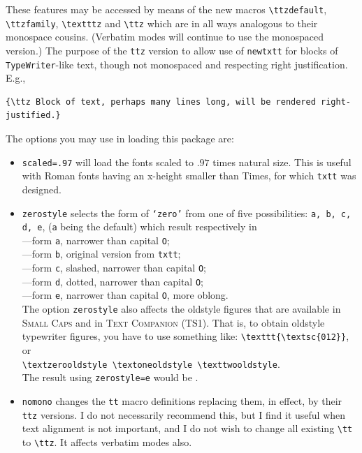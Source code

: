 \documentclass[11pt]{article}
\begin{document}
These features may be accessed by means of the new macros \verb|\ttzdefault|, \verb|\ttzfamily|, \verb|\textttz| and  \verb|\ttz| which are in all ways analogous to their monospace cousins. (Verbatim modes will continue to use the monospaced version.) The purpose of the {\tt ttz} version to allow use of \texttt{newtxtt} for blocks of {\tt TypeWriter}-like text, though not monospaced and respecting  right justification. E.g.,
\begin{verbatim}
{\ttz Block of text, perhaps many lines long, will be rendered right-justified.}
\end{verbatim}

The options you may use in loading this package are:
\begin{itemize}
\item {\tt scaled=.97} will load the fonts scaled to $.97$ times natural size. This is useful with Roman fonts having an x-height smaller than Times, for which {\tt txtt} was designed.
\item
{\tt zerostyle} selects the form of {\tt `zero'} from one of five possibilities: {\tt a, b, c, d, e}, ({\tt a} being the default) which result respectively in\\[6pt] 
{} ---form {\tt a}, narrower than capital {\tt O};\\
{} ---form {\tt b}, original version from {\tt txtt};\\
{} ---form {\tt c}, slashed, narrower than capital {\tt O};\\
{} ---form {\tt d}, dotted, narrower than capital {\tt O};\\ 
{} ---form {\tt e}, narrower than capital {\tt O}, more oblong.\\
The option {\tt zerostyle} also affects the oldstyle figures that are available in \textsc{Small Caps} and in  \textsc{Text Companion} (TS1). That is, to obtain oldstyle typewriter figures, you have to use something like: 
\verb|\texttt{\textsc{012}}|, or \\
\verb|\textzerooldstyle \textoneoldstyle \texttwooldstyle|.\\
The result using {\tt zerostyle=e} would be {}. 
\item
{\tt nomono} changes the {\tt tt} macro definitions replacing them, in effect,  by their {\tt ttz} versions. I do not necessarily recommend this, but I find it useful when text alignment is not important, and I do not wish to change all existing \verb|\tt| to \verb|\ttz|. It affects verbatim modes also.

\end{itemize}
\end{document}
